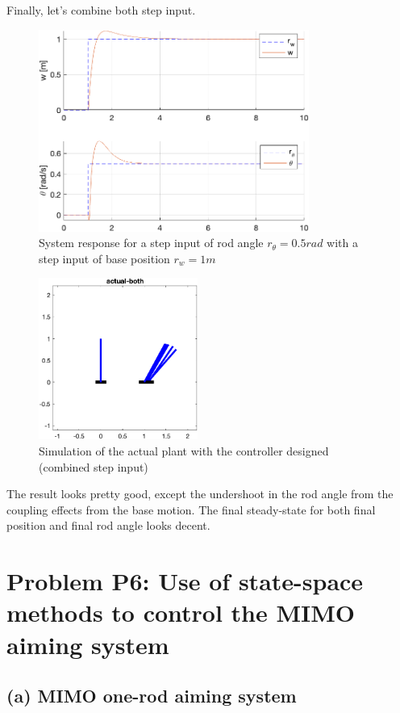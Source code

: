 \documentclass{tron}
\begin{document}
\clearpage
Finally, let's combine both step input.
\begin{figure}[H]
	\centering
	\includegraphics[height=250px]{../matlab/output/p5/square_response_actual-both}
	\caption{System response for a step input of rod angle $r_{\theta}=0.5\unit{rad}$ with a step input of base position $r_{w}=1\unit{m}$}
	\label{fig:p5:P3_aug:sim:both}
\end{figure}
\begin{figure}[H]
	\centering
	\includegraphics[height=200px]{../matlab/output/p5/mimo_sim_actual-both}
	\caption{Simulation of the actual plant with the controller designed (combined step input)}
	\label{fig:p5:P3_aug:sim:both}
\end{figure}

The result looks pretty good, except the undershoot in the rod angle from the coupling effects from the base motion. The final steady-state for both final position and final rod angle looks decent.

\newpage
\section{Problem P6: Use of state-space methods to control the MIMO aiming system}
\subsection{(a) MIMO one-rod aiming system \label{ans:P6-a}}
\end{document}
